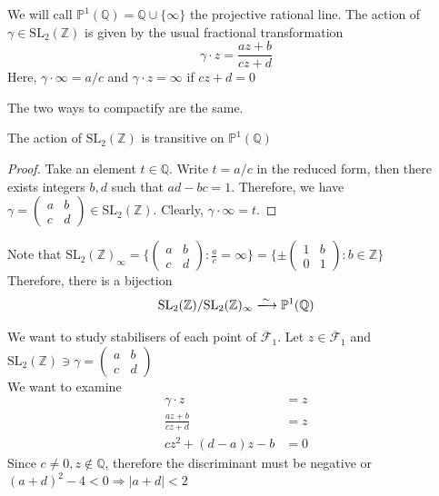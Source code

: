 \documentclass[oneside, 12pt]{scrbook}
\newcommand{\QQ}{\mathbb Q}
\newcommand{\ZZ}{\mathbb Z}
\newcommand{\PP}{\mathbb{P}}
\newcommand{\SL}{\mathrm{SL}}
\theoremstyle{theorem}
\begin{document}
\begin{definition}
We will call $\PP^1(\QQ)= \QQ \cup \{\infty\}$ the projective rational line. The action of $\gamma \in \SL_{2}(\ZZ)$ is given by the usual fractional transformation $$\gamma \cdot z  = \frac{az+ b}{cz+d}$$
Here, $\gamma \cdot \infty = a/c$ and $\gamma \cdot z = \infty$ if $cz+d=0$
\end{definition}

\begin{exercise}
The two ways to compactify are the same.
\end{exercise}

\begin{proposition}
The action of $\SL_{2}(\ZZ)$ is transitive on $\PP^1(\QQ)$
\end{proposition}

\begin{proof}
Take an element $t\in \QQ$. Write $t = a/c$ in the reduced form, then there exists integers $b,d$ such that $ad-bc=1$. Therefore, we have $\gamma = \begin{pmatrix}
a & b \\ c & d 
\end{pmatrix} \in \SL_{2}(\ZZ)$. Clearly, $\gamma \cdot \infty = t$.
\end{proof}

\begin{remark}
Note that $\SL_{2}(\ZZ)_{\infty} = \{\begin{pmatrix}
a & b \\ c & d 
\end{pmatrix}: \frac{a}{c}=\infty\} = \{\pm\begin{pmatrix}
1 & b \\ 0 & 1 
\end{pmatrix}: b \in \ZZ \}$ \\
Therefore, there is a bijection 
\begin{equation*}
\SL_{2}(\ZZ)/\SL_{2}(\ZZ)_{\infty} \xlongrightarrow{\sim} \PP^1(\QQ)
\end{equation*}
\end{remark}

We want to study stabilisers of each point of $\overline{\mathcal{F}}_{1}$. Let $z \in \overline{\mathcal{F}}_{1}$ and $\SL_{2}(\ZZ) \ni \gamma =\begin{pmatrix}
a & b \\ c & d
\end{pmatrix}  $\\

We want to examine 
\begin{align*}
\gamma \cdot z &= z \\
\frac{az+b}{cz+d} &= z \\ 
cz^2 + (d-a)z - b &=0
\end{align*}
Since $c\neq 0 , z \not \in \QQ$, therefore the discriminant must be negative or $(a+d)^2 - 4 < 0 \Rightarrow |a+d|<2$
\end{document}
